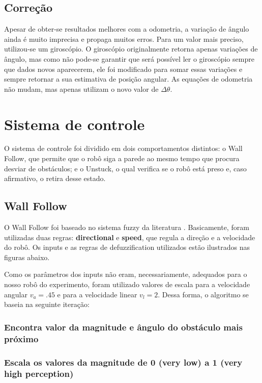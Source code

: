 \documentclass[twoside,conference,a4paper]{IEEEtran}
\begin{document}
\subsection{Correção}

Apesar de obter-se resultados melhores com a odometria, a variação de ângulo ainda é muito imprecisa e propaga muitos erros. Para um valor mais preciso, utilizou-se um giroscópio. O giroscópio originalmente retorna apenas variações de ângulo, mas como não pode-se garantir que será possível ler  o giroscópio sempre que dados novos aparecerem, ele foi modificado para somar essas variações e sempre retornar a sua estimativa de posição angular. As equações de odometria não mudam, mas apenas utilizam o novo valor de $\Delta \theta$.

\section{Sistema de controle}

O sistema de controle foi dividido em dois comportamentos distintos: o Wall Follow, que permite que o robô siga a parede ao mesmo tempo que procura desviar de obstáculos; e o Unstuck, o qual verifica se o robô está preso e, caso afirmativo, o retira desse estado.

\subsection{Wall Follow}

O Wall Follow foi baseado no sistema fuzzy da literatura \cite{Reinhard:1995}. Basicamente, foram utilizadas duas regras: \textbf{directional} e \textbf{speed}, que regula a direção e a velocidade do robô. Os inputs e as regras de  defuzzification utilizados estão ilustrados nas figuras abaixo.

Como os parâmetros dos inputs não eram, necessariamente, adequados para o nosso robô do experimento, foram utilizado valores de escala para a velocidade angular $v_{a} = .45$ e para a velocidade linear $v_{l} = 2$. Dessa forma, o algoritmo se baseia na seguinte iteração:

  \subsubsection{Encontra valor da magnitude e ângulo do obstáculo mais próximo}
  \subsubsection{Escala os valores da magnitude de 0 (very low) a 1 (very high perception)}
\end{document}
